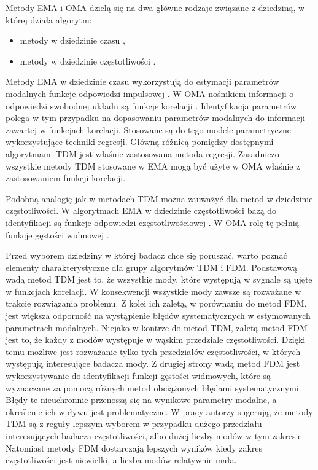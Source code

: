 
Metody EMA i OMA dzielą się na dwa główne rodzaje związane z dziedziną, w której działa algorytm:
\begin{itemize}
	\item metody w dziedzinie czasu ,
	\item metody w dziedzinie częstotliwości .
\end{itemize}
Metody EMA w dziedzinie czasu wykorzystują do estymacji parametrów modalnych funkcje odpowiedzi impulsowej . W OMA nośnikiem informacji o odpowiedzi swobodnej układu  są funkcje korelacji . Identyfikacja parametrów polega w tym przypadku na dopasowaniu parametrów modalnych do informacji zawartej w funkcjach korelacji. Stosowane są do tego modele parametryczne wykorzystujące techniki regresji. Główną różnicą pomiędzy dostępnymi algorytmami TDM jest właśnie zastosowana metoda regresji. Zasadniczo wszystkie metody TDM stosowane w EMA mogą być użyte w OMA właśnie z zastosowaniem funkcji korelacji. 

Podobną analogię jak w metodach TDM można zauważyć dla metod w dziedzinie częstotliwości. W algorytmach EMA w dziedzinie częstotliwości bazą do identyfikacji są funkcje odpowiedzi częstotliwościowej . W OMA rolę tę pełnią funkcje gęstości widmowej .

Przed wyborem dziedziny w której badacz chce się poruszać, warto poznać elementy charakterystyczne dla grupy algorytmów TDM i FDM. Podstawową wadą metod TDM jest to, że wszystkie mody, które występują w sygnale są ujęte w funkcjach korelacji. W konsekwencji wszystkie mody zawsze są rozważane w trakcie rozwiązania problemu. Z kolei ich zaletą, w porównaniu do metod FDM, jest większa odporność na wystąpienie błędów systematycznych w estymowanych parametrach modalnych. Niejako w kontrze do metod TDM, zaletą metod FDM jest to, że każdy z modów występuje w wąskim przedziale częstotliwości. Dzięki temu możliwe jest rozważanie tylko tych przedziałów częstotliwości, w których występują interesujące badacza mody. Z drugiej strony wadą metod FDM jest wykorzystywanie do identyfikacji funkcji gęstości widmowych, które są wyznaczane za pomocą różnych metod obciążonych błędami systematycznymi. Błędy te nieuchronnie przenoszą się na wynikowe parametry modalne, a określenie ich wpływu jest problematyczne. W pracy \cite{Maia1997} autorzy sugerują, że metody TDM są z reguły lepszym wyborem w przypadku dużego przedziału interesujących badacza częstotliwości, albo dużej liczby modów w tym zakresie. Natomiast metody FDM dostarczają lepszych wyników kiedy zakres częstotliwości jest niewielki, a liczba modów relatywnie mała. 

